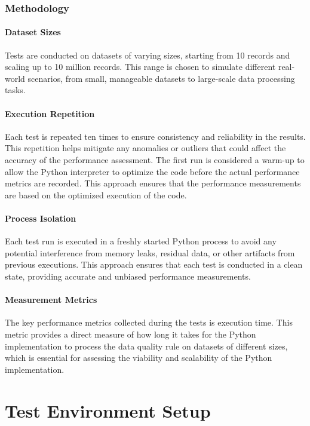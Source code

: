 \subsubsection{Methodology}

\paragraph{Dataset Sizes} Tests are conducted on datasets of varying sizes, starting from 10 records and scaling up to 10 million records. This range is chosen to simulate different real-world scenarios, from small, manageable datasets to large-scale data processing tasks.

\paragraph{Execution Repetition} Each test is repeated ten times to ensure consistency and reliability in the results. This repetition helps mitigate any anomalies or outliers that could affect the accuracy of the performance assessment.
The first run is considered a warm-up to allow the Python interpreter to optimize the code before the actual performance metrics are recorded. This approach ensures that the performance measurements are based on the optimized execution of the code.

\paragraph{Process Isolation} Each test run is executed in a freshly started Python process to avoid any potential interference from memory leaks, residual data, or other artifacts from previous executions. This approach ensures that each test is conducted in a clean state, providing accurate and unbiased performance measurements.

\paragraph{Measurement Metrics} The key performance metrics collected during the tests is execution time. This metric provides a direct measure of how long it takes for the Python implementation to process the data quality rule on datasets of different sizes, which is essential for assessing the viability and scalability of the Python implementation.


\section{Test Environment Setup}

